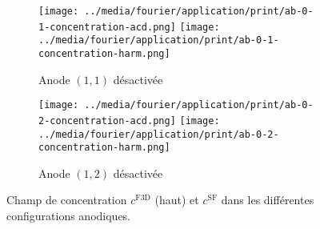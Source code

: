 \begin{figure}
  \begin{center}
    \begin{subfigure}[t]{\textwidth}
      \begin{center}
        \texttt{[image: ../media/fourier/application/print/ab-0-1-concentration-acd.png]}
        \texttt{[image: ../media/fourier/application/print/ab-0-1-concentration-harm.png]}
        \caption{Anode $(1,1)$ désactivée}
        \label{fig:}
      \end{center}
    \end{subfigure}

    \begin{subfigure}[t]{\textwidth}
      \begin{center}
        \texttt{[image: ../media/fourier/application/print/ab-0-2-concentration-acd.png]}
        \texttt{[image: ../media/fourier/application/print/ab-0-2-concentration-harm.png]}
        \caption{Anode $(1,2)$ désactivée}
        \label{fig:}
      \end{center}
    \end{subfigure}


    \caption{Champ de concentration $c^\mathrm{F3D}$ (haut) et
      $c^\mathrm{SF}$ dans les différentes configurations anodiques.}
    \label{fig:harmonic-concentration-comp}
  \end{center}
\end{figure}

